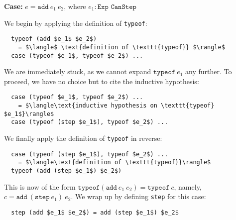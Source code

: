 \documentclass[manuscript,screen,review,sigplan]{acmart}
\begin{document}
\textbf{Case:} $e = \texttt{add}\ e_1\ e_2$, where $e_1 : \texttt{Exp CanStep}$

We begin by applying the definition of \texttt{typeof}:

\begin{lstlisting}
  typeof (add $e_1$ $e_2$)
    = $\langle$ \text{definition of \texttt{typeof}} $\rangle$
  case (typeof $e_1$, typeof $e_2$) ...
\end{lstlisting}

We are immediately stuck, as we cannot expand $\texttt{typeof}\ e_1$ any
further. To proceed, we have no choice but to cite the inductive hypothesis:

\begin{lstlisting}
  case (typeof $e_1$, typeof $e_2$) ...
    = $\langle\text{inductive hypothesis on \texttt{typeof} $e_1$}\rangle$
  case (typeof (step $e_1$), typeof $e_2$) ...
\end{lstlisting}

We finally apply the definition of \texttt{typeof} in reverse:

\begin{lstlisting}
  case (typeof (step $e_1$), typeof $e_2$) ...
    = $\langle\text{definition of \texttt{typeof}}\rangle$
  typeof (add (step $e_1$) $e_2$)
\end{lstlisting}

This is now of the form $\texttt{typeof} (\texttt{add}\ e_1\ e_2) = \texttt{typeof}\ c$,
namely, $c = \texttt{add}\ (\texttt{step}\ e_1)\ e_2$. We wrap up by defining
\texttt{step} for this case:

\begin{lstlisting}
  step (add $e_1$ $e_2$) = add (step $e_1$) $e_2$
\end{lstlisting}



\end{document}
